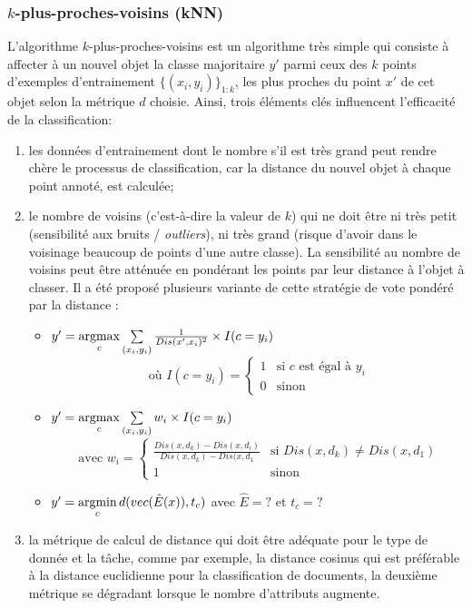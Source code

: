 \subsubsection{$k$-plus-proches-voisins (kNN)}
L'algorithme $k$-plus-proches-voisins est un algorithme très simple qui consiste à affecter à un nouvel objet la classe majoritaire $y'$ parmi ceux des $k$ points d'exemples d'entrainement $\lbrace (x_i,y_i) \rbrace_{1:k}$, les plus proches du point $x'$ de cet objet selon la métrique $d$ choisie. Ainsi, trois éléments clés influencent l'efficacité de la classification:
\begin{enumerate}
	\item les données d'entrainement dont le nombre s'il est très grand peut rendre chère le processus de classification, car la distance du nouvel objet à chaque point annoté, est calculée;
	\item le nombre de voisins (c'est-à-dire la valeur de $k$) qui ne doit être ni très petit (sensibilité aux bruits / \textit{outliers}), ni très grand (risque d'avoir dans le voisinage beaucoup de points d'une autre classe). La sensibilité au nombre de voisins peut être atténuée en pondérant les points par leur distance à l'objet à classer. Il a été proposé plusieurs variante de cette stratégie de \og vote pondéré par la distance \fg{}:
	\begin{itemize}
		\item $y' = \mathop{\mathrm{argmax}}\limits\limits_c \sum\limits_{(x_i,y_i)} \frac{1}{Dis(x', x_i)^2} \times I(c = y_i)$  \citep{dudani1976originalwknn} \[\text{ où } I(c=y_i) = \left\lbrace \begin{array}{ll}
		1 & \text{si }c \text{ est égal à } y_i \\
		0 & \text{sinon}
		\end{array} \right.\]
		\item $y' = \mathop{\mathrm{argmax}}\limits\limits_c \sum\limits_{(x_i,y_i)} w_i \times I(c = y_i)$ \citep{gou2011wknn} \[\text{ avec } w_i = \left\lbrace \begin{array}{ll}
		\frac{Dis(x, d_k) - Dis(x, d_i)}{Dis(x, d_k) - Dis(x, d_1} & \text{si } Dis(x, d_k) \neq Dis(x, d_1) \\
		1 & \text{sinon}
		\end{array} \right.\]
		\item $y' = \mathop{\mathrm{argmin}}\limits\limits_c d(vec(\hat{E}(x)),t_c)$ \citep{bicego2016wknnrevisited} avec $\hat{E} = ?$ et $t_c = ?$
	\end{itemize}
	 
	\item la métrique de calcul de distance qui doit être adéquate pour le type de donnée et la tâche, comme par exemple, la distance cosinus qui est préférable à la distance euclidienne pour la classification de documents, la deuxième métrique se dégradant lorsque le nombre d'attributs augmente.
\end{enumerate}


